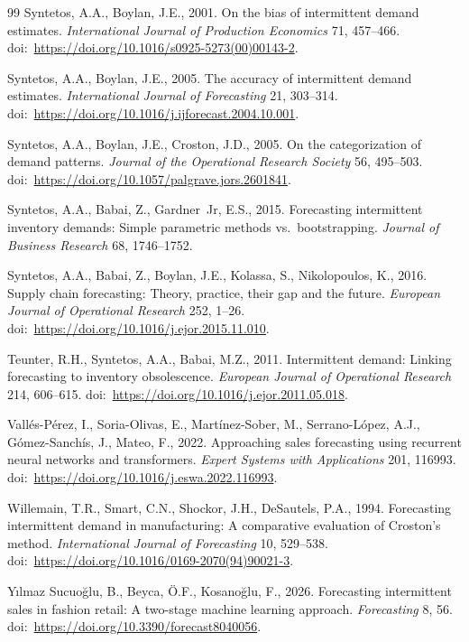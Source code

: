 \documentclass[review,authoryear]{elsarticle}
\begin{document}
\begin{thebibliography}{99}
Syntetos, A.A., Boylan, J.E., 2001.
On the bias of intermittent demand estimates.
\textit{International Journal of Production Economics} 71, 457--466.
doi:\ \url{https://doi.org/10.1016/s0925-5273(00)00143-2}.

Syntetos, A.A., Boylan, J.E., 2005.
The accuracy of intermittent demand estimates.
\textit{International Journal of Forecasting} 21, 303--314.
doi:\ \url{https://doi.org/10.1016/j.ijforecast.2004.10.001}.

Syntetos, A.A., Boylan, J.E., Croston, J.D., 2005.
On the categorization of demand patterns.
\textit{Journal of the Operational Research Society} 56, 495--503.
doi:\ \url{https://doi.org/10.1057/palgrave.jors.2601841}.

Syntetos, A.A., Babai, Z., Gardner~Jr, E.S., 2015.
Forecasting intermittent inventory demands: Simple parametric methods vs.\ bootstrapping.
\textit{Journal of Business Research} 68, 1746--1752.

Syntetos, A.A., Babai, Z., Boylan, J.E., Kolassa, S., Nikolopoulos, K., 2016.
Supply chain forecasting: Theory, practice, their gap and the future.
\textit{European Journal of Operational Research} 252, 1--26.
doi:\ \url{https://doi.org/10.1016/j.ejor.2015.11.010}.

Teunter, R.H., Syntetos, A.A., Babai, M.Z., 2011.
Intermittent demand: Linking forecasting to inventory obsolescence.
\textit{European Journal of Operational Research} 214, 606--615.
doi:\ \url{https://doi.org/10.1016/j.ejor.2011.05.018}.

Vall\'es-P\'erez, I., Soria-Olivas, E., Mart\'inez-Sober, M., Serrano-L\'opez, A.J., G\'omez-Sanch\'is, J., Mateo, F., 2022.
Approaching sales forecasting using recurrent neural networks and transformers.
\textit{Expert Systems with Applications} 201, 116993.
doi:\ \url{https://doi.org/10.1016/j.eswa.2022.116993}.

Willemain, T.R., Smart, C.N., Shockor, J.H., DeSautels, P.A., 1994.
Forecasting intermittent demand in manufacturing: A comparative evaluation of Croston's method.
\textit{International Journal of Forecasting} 10, 529--538.
doi:\ \url{https://doi.org/10.1016/0169-2070(94)90021-3}.

Y{\i}lmaz Sucuo{\u{g}}lu, B., Beyca, {\"O}.F., Kosano{\u{g}}lu, F., 2026.
Forecasting intermittent sales in fashion retail: A two-stage machine learning approach.
\textit{Forecasting} 8, 56.
doi:\ \url{https://doi.org/10.3390/forecast8040056}.

\end{thebibliography}
\end{document}
